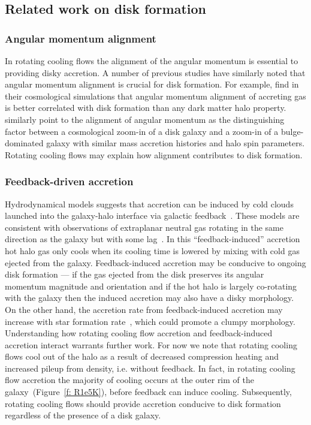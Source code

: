 \documentclass[fleqn,usenatbib]{mnras}
\begin{document}
\subsection{Related work on disk formation}
\label{s: other disk formation}

\subsubsection{Angular momentum alignment}
\label{s: other disk formation -- alignment}

In rotating cooling flows the alignment of the angular momentum is essential to providing disky accretion.
A number of previous studies have similarly noted that angular momentum alignment is crucial for disk formation.
For example, \cite{Sales2012} find in their cosmological simulations that angular momentum alignment of accreting gas is better correlated with disk formation than any dark matter halo property.
\cite{Kretschmer2020} similarly point to the alignment of angular momentum as the distinguishing factor between a cosmological zoom-in of a disk galaxy and a zoom-in of a bulge-dominated galaxy with similar mass accretion histories and halo spin parameters.
Rotating cooling flows may explain how alignment contributes to disk formation.

\subsubsection{Feedback-driven accretion}
\label{s: other disk formation -- feedback-driven}

Hydrodynamical models suggests that accretion can be induced by cold clouds launched into the galaxy-halo interface via galactic feedback~\citep[e.g.][]{Marinacci2010, Marinacci2011, Marinacci2012, Armillotta2016a, Fraternali2017}.
These models are consistent with observations of extraplanar neutral gas rotating in the same direction as the galaxy but with some lag~\citep[e.g.][]{Fraternali2008,  Marasco2012}.
In this ``feedback-induced'' accretion hot halo gas only cools when its cooling time is lowered by mixing with cold gas ejected from the galaxy.
Feedback-induced accretion may be conducive to ongoing disk formation --- if the gas ejected from the disk preserves its angular momentum magnitude and orientation and if the hot halo is largely co-rotating with the galaxy then the induced accretion may also have a disky morphology.
On the other hand, the accretion rate from feedback-induced accretion may increase with star formation rate~\citep{Hobbs2020}, which could promote a clumpy morphology.
Understanding how rotating cooling flow accretion and feedback-induced accretion interact warrants further work.
For now we note that rotating cooling flows cool out of the halo as a result of decreased compression heating and increased pileup from density, i.e. without feedback.
In fact, in rotating cooling flow accretion the majority of cooling occurs at the outer rim of the galaxy~(Figure~\ref{f: R1e5K}), before feedback can induce cooling.
Subsequently, rotating cooling flows should provide accretion conducive to disk formation regardless of the presence of a disk galaxy.
\end{document}
